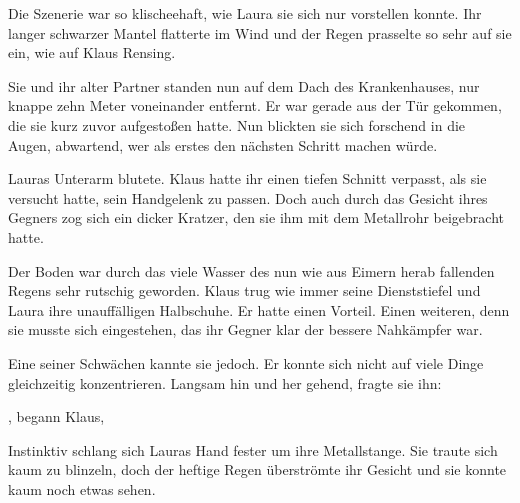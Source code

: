 Die Szenerie war so klischeehaft, wie Laura sie sich nur vorstellen konnte. Ihr langer schwarzer Mantel flatterte im Wind und der Regen prasselte so sehr auf sie ein, wie auf Klaus Rensing.

\par

Sie und ihr alter Partner standen nun auf dem Dach des Krankenhauses, nur knappe zehn Meter voneinander entfernt. Er war gerade aus der Tür gekommen, die sie kurz zuvor aufgestoßen hatte. Nun blickten sie sich forschend in die Augen, abwartend, wer als erstes den nächsten Schritt machen würde.

\par

Lauras Unterarm blutete. Klaus hatte ihr einen tiefen Schnitt verpasst, als sie versucht hatte, sein Handgelenk zu passen. Doch auch durch das Gesicht ihres Gegners zog sich ein dicker Kratzer, den sie ihm mit dem Metallrohr beigebracht hatte.

\par

Der Boden war durch das viele Wasser des nun wie aus Eimern herab fallenden Regens sehr rutschig geworden. Klaus trug wie immer seine Dienststiefel und Laura ihre unauffälligen Halbschuhe. Er hatte einen Vorteil. Einen weiteren, denn sie musste sich eingestehen, das ihr Gegner klar der bessere Nahkämpfer war.

\par

Eine seiner Schwächen kannte sie jedoch. Er konnte sich nicht auf viele Dinge gleichzeitig konzentrieren. Langsam hin und her gehend, fragte sie ihn: 

\par

, begann Klaus, 

\par

Instinktiv schlang sich Lauras Hand fester um ihre Metallstange. Sie traute sich kaum zu blinzeln, doch der heftige Regen überströmte ihr Gesicht und sie konnte kaum noch etwas sehen.

